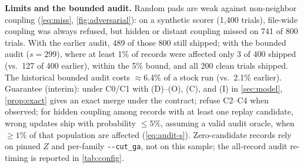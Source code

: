 \documentclass[letterpaper,twocolumn,10pt]{article}
\theoremstyle{definition}
\newcommand{\cutga}{\texttt{-{}-cut\_ga}\xspace}
\begin{document}
\textbf{Limits and the bounded audit.} Random pads are weak against non\nobreakdash-neighbor coupling (\cref{eq:miss}, \cref{fig:adversarial}):
on a synthetic scorer (1{,}400 trials), file\nobreakdash-wide coupling was always refused, but hidden or distant coupling missed on 741 of
800 trials. With the earlier audit, 489 of those 800 still shipped; with the bounded audit ($s{=}299$), where at least 1\% of
records were affected only 3 of 400 shipped (vs.\ 127 of 400 earlier), within the 5\% bound, and all 200 clean trials
shipped. The historical bounded audit costs $\approx$6.4\% of a stock run (vs.\ 2.1\% earlier). Guarantee (interim): under C0/C1 with
(D)--(O), (C), and (I) in \cref{sec:model}, \cref{prop:exact} gives an exact merge under the contract; refuse C2--C4 when observed; for
hidden coupling among records with at least one replay candidate, wrong updates ship with probability $\le 5\%$, assuming a valid audit oracle, when
$\ge 1\%$ of that population are affected (\cref{eq:audit-s}). Zero\nobreakdash-candidate records rely on pinned $Z$ and per\nobreakdash-family
\cutga, not on this sample; the all\nobreakdash-record audit re\nobreakdash-timing is reported in \cref{tab:config}.
\end{document}
